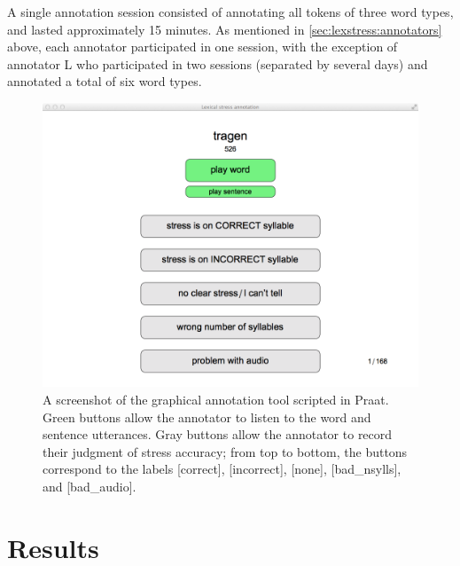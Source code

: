 A single annotation session consisted of annotating all tokens of three word types, and lasted approximately 15 minutes. As mentioned in \cref{sec:lexstress:annotators} above, each annotator participated in one session, with the exception of annotator L who participated in two sessions (separated by several days) and annotated a total of six word types.
	
		\begin{figure}[bht]
			\centering
			\includegraphics[width=\textwidth]{img/screenshots/AnnotationTool}
			\caption[A screenshot of the graphical annotation tool scripted in Praat.]{A screenshot of the graphical annotation tool scripted in Praat. Green buttons allow the annotator to listen to  the word and sentence utterances. Gray buttons allow the annotator to record their judgment of stress accuracy; from top to bottom, the buttons correspond to the labels [correct], [incorrect], [none], [bad\_nsylls], and [bad\_audio]. }
			\label{fig:annotationtool}
		\end{figure}
	
	\section{Results}
	\label{sec:lexstress:results}	
	
	
	

